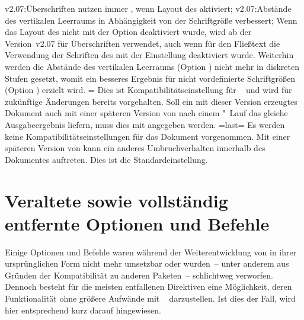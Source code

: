 \begin{Entity}{}
\begin{Declaration}
\begin{DeclareValues}
{    v2.07:Überschriften nutzen immer \OpenSans, wenn Layout des \CDs aktiviert;%
    v2.07:Abstände des vertikalen Leerraums in Abhängigkeit von der 
      Schriftgröße verbessert;%
  }%
  Wenn das Layout des \CDs nicht mit der Option  deaktiviert 
  wurde, wird ab der Version~v2.07 für Überschriften \OpenSans verwendet, auch 
  wenn für den Fließtext die Verwendung der Schriften des \CDs mit der 
  Einstellung  deaktiviert wurde. Weiterhin werden die 
  Abstände des vertikalen Leerraums (Option ) nicht 
  mehr in diskreten Stufen gesetzt, womit ein besseres Ergebnis für nicht 
  vordefinierte Schriftgrößen (Option ) erzielt wird.
=
  Dies ist Kompatibilitätseinstellung für \TUDScript~\vTUDScript{} und wird für 
  zukünftige Änderungen bereits vorgehalten. Soll ein mit dieser Version 
  erzeugtes Dokument auch mit einer späteren Version von \TUDScript nach einem 
  "~Lauf das gleiche Ausgabeergebnis liefern, muss dies mit 
   angegeben werden.
\itemval=last=
  Es werden keine Kompatibilitätseinstellungen für das Dokument vorgenommen. 
  Mit einer späteren Version von \TUDScript kann ein anderes Umbruchverhalten 
  innerhalb des Dokumentes auftreten. Dies ist die Standardeinstellung.%
\end{DeclareValues}
\end{Declaration}



\section{%
  Veraltete sowie vollständig entfernte Optionen und Befehle%
  \label{sec:obsolete}%
}
%
Einige Optionen und Befehle waren während der Weiterentwicklung von \TUDScript
in ihrer ursprünglichen Form nicht mehr umsetzbar oder wurden~-- unter anderem 
aus Gründen der Kompatibilität zu anderen Paketen~-- schlichtweg verworfen. 
Dennoch besteht für die meisten entfallenen Direktiven eine Möglichkeit, deren 
Funktionalität ohne größere Aufwände mit \TUDScript~\vTUDScript{} darzustellen. 
Ist dies der Fall, wird hier entsprechend kurz darauf hingewiesen.




\end{Entity}
